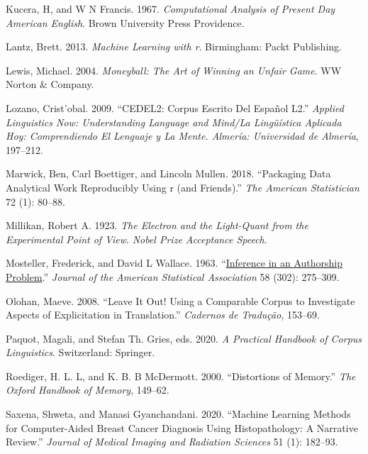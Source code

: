 \documentclass[
  letterpaper,
]{latex/krantz}
\newlength{\cslhangindent}
\newlength{\cslentryspacingunit} %
\newenvironment{CSLReferences}[2] %
 {%
  \setlength{\parindent}{0pt}
  \ifodd #1
  \let\oldpar\par
  \def\par{\hangindent=\cslhangindent\oldpar}
  \fi
  \setlength{\parskip}{#2\cslentryspacingunit}
 }%
 {}
\begin{document}
\begin{CSLReferences}{1}{0}
\leavevmode{}%
Kucera, H, and W N Francis. 1967. \emph{Computational Analysis of
Present Day American English}. Brown University Press Providence.

\leavevmode{}%
Lantz, Brett. 2013. \emph{Machine Learning with r}. Birmingham: Packt
Publishing.

\leavevmode{}%
Lewis, Michael. 2004. \emph{Moneyball: The Art of Winning an Unfair
Game}. WW Norton \& Company.

\leavevmode{}%
Lozano, Crist'obal. 2009. {``CEDEL2: Corpus Escrito Del Español L2.''}
\emph{Applied Linguistics Now: Understanding Language and Mind/La
Lingüística Aplicada Hoy: Comprendiendo El Lenguaje y La Mente. Almería:
Universidad de Almería}, 197--212.

\leavevmode{}%
Marwick, Ben, Carl Boettiger, and Lincoln Mullen. 2018. {``Packaging
Data Analytical Work Reproducibly Using r (and Friends).''} \emph{The
American Statistician} 72 (1): 80--88.

\leavevmode{}%
Millikan, Robert A. 1923. \emph{The Electron and the Light-Quant from
the Experimental Point of View}. \emph{Nobel Prize Acceptance Speech}.

\leavevmode{}%
Mosteller, Frederick, and David L Wallace. 1963.
{``\href{https://www.ncbi.nlm.nih.gov/pubmed/3427}{Inference in an
Authorship Problem}.''} \emph{Journal of the American Statistical
Association} 58 (302): 275--309.

\leavevmode{}%
Olohan, Maeve. 2008. {``Leave It Out! Using a Comparable Corpus to
Investigate Aspects of Explicitation in Translation.''} \emph{Cadernos
de Tradução}, 153--69.

\leavevmode{}%
Paquot, Magali, and Stefan Th. Gries, eds. 2020. \emph{A Practical
Handbook of Corpus Linguistics}. Switzerland: Springer.

\leavevmode{}%
Roediger, H. L. L, and K. B. B McDermott. 2000. {``Distortions of
Memory.''} \emph{The Oxford Handbook of Memory}, 149--62.

\leavevmode{}%
Saxena, Shweta, and Manasi Gyanchandani. 2020. {``Machine Learning
Methods for Computer-Aided Breast Cancer Diagnosis Using Histopathology:
A Narrative Review.''} \emph{Journal of Medical Imaging and Radiation
Sciences} 51 (1): 182--93.


\end{CSLReferences}
\end{document}
